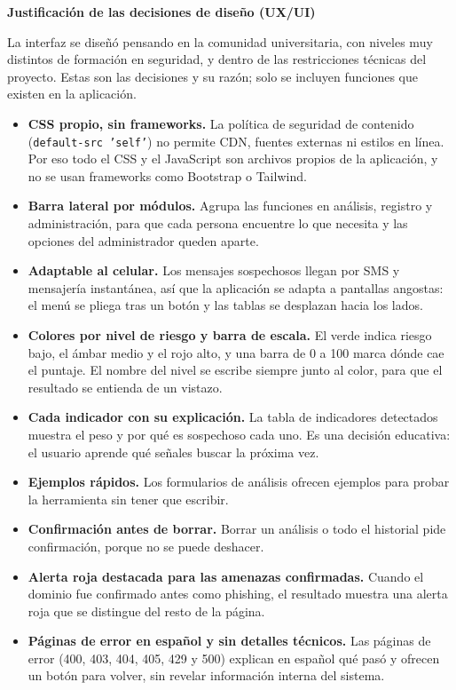 \documentclass[journal,onecolumn,12pt,draftclsnofoot]{IEEEtran}
\newcommand{\apartado}[1]{\par\medskip\noindent\textbf{#1}\par\smallskip}
\begin{document}
\apartado{Justificación de las decisiones de diseño (UX/UI)}

La interfaz se diseñó pensando en la comunidad universitaria, con niveles muy distintos de formación en seguridad, y dentro de las restricciones técnicas del proyecto. Estas son las decisiones y su razón; solo se incluyen funciones que existen en la aplicación.

\begin{itemize}
  \item \textbf{CSS propio, sin frameworks.} La política de seguridad de contenido (\texttt{default-src 'self'}) no permite CDN, fuentes externas ni estilos en línea. Por eso todo el CSS y el JavaScript son archivos propios de la aplicación, y no se usan frameworks como Bootstrap o Tailwind.
  \item \textbf{Barra lateral por módulos.} Agrupa las funciones en análisis, registro y administración, para que cada persona encuentre lo que necesita y las opciones del administrador queden aparte.
  \item \textbf{Adaptable al celular.} Los mensajes sospechosos llegan por SMS y mensajería instantánea, así que la aplicación se adapta a pantallas angostas: el menú se pliega tras un botón y las tablas se desplazan hacia los lados.
  \item \textbf{Colores por nivel de riesgo y barra de escala.} El verde indica riesgo bajo, el ámbar medio y el rojo alto, y una barra de 0 a 100 marca dónde cae el puntaje. El nombre del nivel se escribe siempre junto al color, para que el resultado se entienda de un vistazo.
  \item \textbf{Cada indicador con su explicación.} La tabla de indicadores detectados muestra el peso y por qué es sospechoso cada uno. Es una decisión educativa: el usuario aprende qué señales buscar la próxima vez.
  \item \textbf{Ejemplos rápidos.} Los formularios de análisis ofrecen ejemplos para probar la herramienta sin tener que escribir.
  \item \textbf{Confirmación antes de borrar.} Borrar un análisis o todo el historial pide confirmación, porque no se puede deshacer.
  \item \textbf{Alerta roja destacada para las amenazas confirmadas.} Cuando el dominio fue confirmado antes como phishing, el resultado muestra una alerta roja que se distingue del resto de la página.
  \item \textbf{Páginas de error en español y sin detalles técnicos.} Las páginas de error (400, 403, 404, 405, 429 y 500) explican en español qué pasó y ofrecen un botón para volver, sin revelar información interna del sistema.
\end{itemize}
\end{document}

